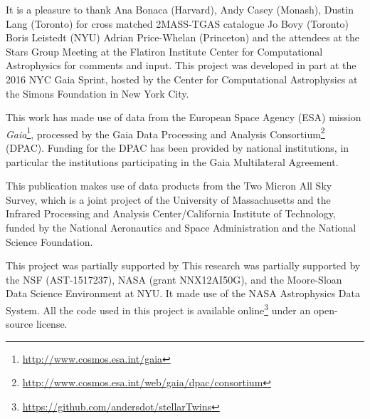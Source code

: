 \documentclass[modern]{aastex61}
\newcommand\BLcomment[1]{{\color{cyan}{[BL: #1]}}}
\newcommand{\acronym}[1]{{\small{#1}}}
\newcommand{\project}[1]{\textsl{#1}}
\newcommand{\gaia}{\project{Gaia}}
\begin{document}
\acknowledgments It is a pleasure to thank
  Ana Bonaca (Harvard),
  Andy Casey (Monash),
  Dustin Lang (Toronto) for cross matched 2MASS-TGAS catalogue
  Jo Bovy (Toronto)
  Boris Leistedt (NYU)
  Adrian Price-Whelan (Princeton)
and the attendees at the Stars Group Meeting at the Flatiron Institute
Center for Computational Astrophysics for comments and input.
This project was developed in part at the 2016 \acronym{NYC} Gaia Sprint, hosted
by the Center for Computational Astrophysics at the Simons Foundation
in New York City.

This work has made use of data from the European Space Agency (\acronym{ESA})
mission \gaia\footnote{\url{http://www.cosmos.esa.int/gaia}}, processed by the Gaia
Data Processing and Analysis Consortium\footnote{\url{http://www.cosmos.esa.int/web/gaia/dpac/consortium}} (\acronym{DPAC}). Funding for the
\acronym{DPAC} has been provided by national institutions, in particular the
institutions participating in the Gaia Multilateral Agreement.

This publication makes use of data products from the Two Micron All
Sky Survey, which is a joint project of the
University of Massachusetts and the Infrared Processing and Analysis
Center/California Institute of Technology, funded by the National
Aeronautics and Space Administration and the National Science
Foundation.

This project was partially supported by This research was partially supported by
  the \acronym{NSF} (\acronym{AST-1517237}),
  \acronym{NASA} (grant \acronym{NNX12AI50G}),
  and the Moore-Sloan Data Science Environment at \acronym{NYU}.
It made use of the \acronym{NASA} Astrophysics Data System.
All the code used in this project is available online\footnote{\url{https://github.com/andersdot/stellarTwins}} under an open-source license. \BLcomment{wrong link.}




\clearpage
\end{document}
